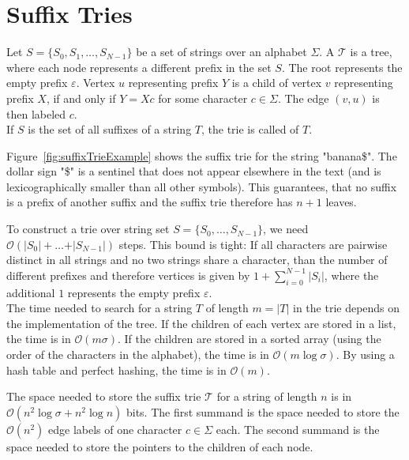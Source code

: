 \section{Suffix Tries}

\begin{Definition}
  Let $S = \{S_0, S_1, \ldots, S_{N-1}\}$ be a set of strings over an alphabet $\Sigma$. A  $\mathcal{T}$ is a tree, where each node represents a different prefix in the set $S$. The root represents the empty prefix $\varepsilon$. Vertex $u$ representing prefix $Y$ is a child of vertex $v$ representing prefix $X$, if and only if $Y = Xc$ for some character $c \in \Sigma$. The edge $(v,u)$ is then labeled $c$.\\
  If $S$ is the set of all suffixes of a string $T$, the trie is called  of $T$.
\end{Definition}

\begin{Example}
  Figure~\ref{fig:suffixTrieExample} shows the suffix trie for the string "banana\$". The dollar sign "\$" is a sentinel that does not appear elsewhere in the text (and is lexicographically smaller than all other symbols). This guarantees, that no suffix is a prefix of another suffix and the suffix trie therefore has $n+1$ leaves.
\end{Example}

To construct a trie over string set $S = \{S_0, \ldots, S_{N-1}\}$, we need $\mathcal{O}(\vert S_0 \vert + \ldots + \vert S_{N-1} \vert)$ steps. This bound is tight: If all characters are pairwise distinct in all strings and no two strings share a character, than the number of different prefixes and therefore vertices is given by $1 + \sum_{i=0}^{N-1} \vert S_i \vert$, where the additional $1$ represents the empty prefix $\varepsilon$.\\
The time needed to search for a string $T$ of length $m = \vert T \vert$ in the trie depends on the implementation of the tree. If the children of each vertex are stored in a list, the time is in $\mathcal{O}(m\sigma)$. If the children are stored in a sorted array (using the order of the characters in the alphabet), the time is in $\mathcal{O}(m\log \sigma)$. By using a hash table and perfect hashing, the time is in $\mathcal{O}(m)$.

The space needed to store the suffix trie $\mathcal{T}$ for a string of length $n$ is in $\mathcal{O}{(n^2\log \sigma + n^2\log n)}$ bits. The first summand is the space needed to store the $\mathcal{O}(n^2)$ edge labels of one character $c \in \Sigma$ each. The second summand is the space needed to store the pointers to the children of each node.

